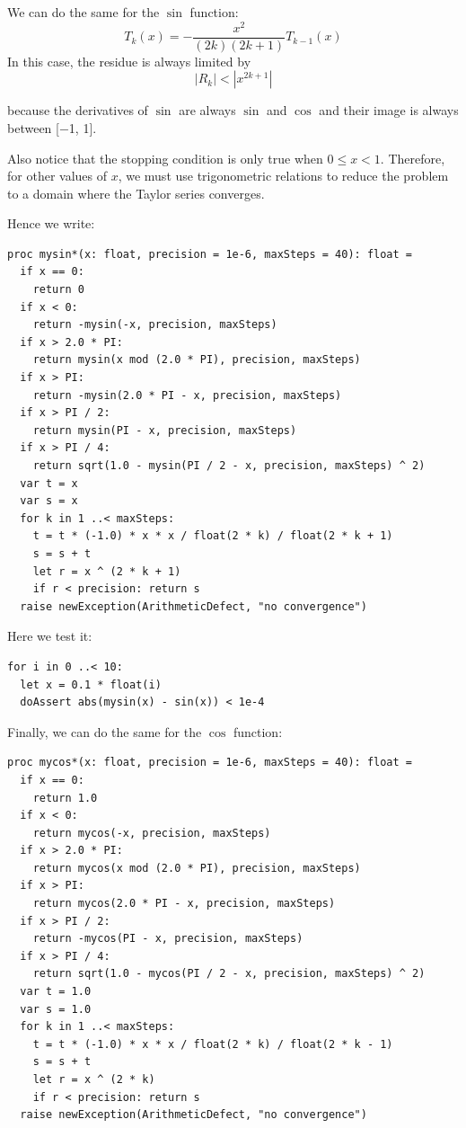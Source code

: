 \documentclass[justified, sixbynine]{tufte-book}
\def\ft{\small\tt}
\theoremstyle{plain}%
\newtheorem * {corollary}{Corollary}
\theoremstyle{definition}
\theoremstyle{remark}
\newtheorem * {remark}{Remark}
\newtheorem * {note}{Note}
\begin{document}
\begin{fullwidth}
We can do the same for the $\sin$ function:
\begin{equation}
T_k(x) = -\frac{x^2}{(2k)(2k+1)}T_{k-1}(x)
\end{equation}
In this case, the residue is always limited by
\begin{equation}
|R_k| < |x^{2k+1}|
\end{equation}

because the derivatives of $\sin$ are always $\sin$ and $\cos$ and their image is always between [$-$1, 1].

Also notice that the stopping condition is only true when $0\leq x<1$. Therefore, for other values of $x$, we must use trigonometric relations to reduce the problem to a domain where the Taylor series converges.

Hence we write:

\begin{lstlisting}[caption={in file: {\ft nlib.nim}}]
proc mysin*(x: float, precision = 1e-6, maxSteps = 40): float =
  if x == 0:
    return 0
  if x < 0:
    return -mysin(-x, precision, maxSteps)
  if x > 2.0 * PI:
    return mysin(x mod (2.0 * PI), precision, maxSteps)
  if x > PI:
    return -mysin(2.0 * PI - x, precision, maxSteps)
  if x > PI / 2:
    return mysin(PI - x, precision, maxSteps)
  if x > PI / 4:
    return sqrt(1.0 - mysin(PI / 2 - x, precision, maxSteps) ^ 2)
  var t = x
  var s = x
  for k in 1 ..< maxSteps:
    t = t * (-1.0) * x * x / float(2 * k) / float(2 * k + 1)
    s = s + t
    let r = x ^ (2 * k + 1)
    if r < precision: return s
  raise newException(ArithmeticDefect, "no convergence")
\end{lstlisting}

Here we test it:
\begin{lstlisting}
for i in 0 ..< 10:
  let x = 0.1 * float(i)
  doAssert abs(mysin(x) - sin(x)) < 1e-4
\end{lstlisting}

Finally, we can do the same for the $\cos$ function:

\begin{lstlisting}[caption={in file: {\ft nlib.nim}}]
proc mycos*(x: float, precision = 1e-6, maxSteps = 40): float =
  if x == 0:
    return 1.0
  if x < 0:
    return mycos(-x, precision, maxSteps)
  if x > 2.0 * PI:
    return mycos(x mod (2.0 * PI), precision, maxSteps)
  if x > PI:
    return mycos(2.0 * PI - x, precision, maxSteps)
  if x > PI / 2:
    return -mycos(PI - x, precision, maxSteps)
  if x > PI / 4:
    return sqrt(1.0 - mycos(PI / 2 - x, precision, maxSteps) ^ 2)
  var t = 1.0
  var s = 1.0
  for k in 1 ..< maxSteps:
    t = t * (-1.0) * x * x / float(2 * k) / float(2 * k - 1)
    s = s + t
    let r = x ^ (2 * k)
    if r < precision: return s
  raise newException(ArithmeticDefect, "no convergence")
\end{lstlisting}


\end{fullwidth}
\end{document}
